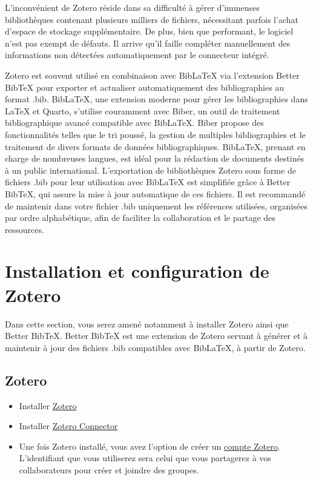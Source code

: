 \documentclass[
  letterpaper,
]{scrbook}
\begin{document}
L'inconvénient de Zotero réside dans sa difficulté à gérer d'immenses
bibliothèques contenant plusieurs milliers de fichiers, nécessitant
parfois l'achat d'espace de stockage supplémentaire. De plus, bien que
performant, le logiciel n'est pas exempt de défauts. Il arrive qu'il
faille compléter manuellement des informations non détectées
automatiquement par le connecteur intégré.

Zotero est souvent utilisé en combinaison avec BibLaTeX via l'extension
Better BibTeX pour exporter et actualiser automatiquement des
bibliographies au format .bib. BibLaTeX, une extension moderne pour
gérer les bibliographies dans LaTeX et Quarto, s'utilise couramment avec
Biber, un outil de traitement bibliographique avancé compatible avec
BibLaTeX. Biber propose des fonctionnalités telles que le tri poussé, la
gestion de multiples bibliographies et le traitement de divers formats
de données bibliographiques. BibLaTeX, prenant en charge de nombreuses
langues, est idéal pour la rédaction de documents destinés à un public
international. L'exportation de bibliothèques Zotero sous forme de
fichiers .bib pour leur utilisation avec BibLaTeX est simplifiée grâce à
Better BibTeX, qui assure la mise à jour automatique de ces fichiers. Il
est recommandé de maintenir dans votre fichier .bib uniquement les
références utilisées, organisées par ordre alphabétique, afin de
faciliter la collaboration et le partage des ressources.

\hypertarget{installation-et-configuration-de-zotero}{%
\section{Installation et configuration de
Zotero}\label{installation-et-configuration-de-zotero}}

Dans cette section, vous serez amené notamment à installer Zotero ainsi
que Better BibTeX. Better BibTeX est une extension de Zotero servant à
générer et à maintenir à jour des fichiers .bib compatibles avec
BibLaTeX, à partir de Zotero.

\hypertarget{zotero}{%
\subsection{Zotero}\label{zotero}}

\begin{itemize}
\item
  Installer \href{https://www.zotero.org/download/}{Zotero}
\item
  Installer \href{https://www.zotero.org/download/}{Zotero Connector}
\item
  Une fois Zotero installé, vous avez l'option de créer un
  \href{https://www.zotero.org/user/register/}{compte Zotero}.
  L'identifiant que vous utiliserez sera celui que vous partagerez à vos
  collaborateurs pour créer et joindre des groupes.
\end{itemize}
\end{document}
